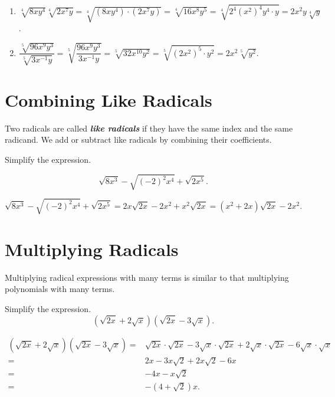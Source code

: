 \documentclass[en,12pt]{elegantbook}
\providecommand{\tightlist}{%
  \setlength{\itemsep}{0pt}\setlength{\parskip}{0pt}}
\providecommand{\tightlist}{%
  \setlength{\itemsep}{0pt}\setlength{\parskip}{0pt}}
\let\BeginKnitrBlock\begin \let\EndKnitrBlock\end
\begin{document}
\BeginKnitrBlock{solution}


\begin{enumerate}
\def\labelenumi{\arabic{enumi}.}
\tightlist
\item
  \(\sqrt[4]{8xy^4}\sqrt[4]{2x^7y}=\sqrt[4]{(8xy^4)\cdot (2x^7y)}=\sqrt[4]{16x^8y^5}=\sqrt[4]{2^4(x^2)^4y^4\cdot y}=2x^2y\sqrt[4]{y}\).
\item
  \(\dfrac{ \sqrt[5]{96x^9y^3} }{ \sqrt[5]{3x^{-1}y} }=\sqrt[5]{\dfrac{96x^9y^3}{3x^{-1}y}}=\sqrt[5]{32x^{10}y^2}=\sqrt[5]{(2x^2)^5\cdot y^2}=2x^2\sqrt[5]{y^2}\).
\end{enumerate}
\EndKnitrBlock{solution}

\hypertarget{combining-like-radicals}{%
\section{Combining Like Radicals}\label{combining-like-radicals}}

Two radicals are called \textbf{\emph{like radicals}} if they have the same index and the same radicand. We add or subtract like radicals by combining their coefficients.

\BeginKnitrBlock{example}
\protect\hypertarget{exm:unnamed-chunk-75}{}{\label{exm:unnamed-chunk-75} }
Simplify the expression.

\[
\sqrt{8x^3}-\sqrt{(-2)^2 x^4}+\sqrt{2x^5}.
\]
\EndKnitrBlock{example}

\BeginKnitrBlock{solution}


\[
\sqrt{8x^3}-\sqrt{(-2)^2 x^4}+\sqrt{2x^5}=2x\sqrt{2x}-2x^2+x^2\sqrt{2x}=(x^2+2x)\sqrt{2x}-2x^2.
\]
\EndKnitrBlock{solution}

\hypertarget{multiplying-radicals}{%
\section{Multiplying Radicals}\label{multiplying-radicals}}

Multiplying radical expressions with many terms is similar to that multiplying polynomials with many terms.

\BeginKnitrBlock{example}
\protect\hypertarget{exm:unnamed-chunk-77}{}{\label{exm:unnamed-chunk-77} }
Simplify the expression.
\[
(\sqrt{2x}+2\sqrt{x})(\sqrt{2x}-3\sqrt{x}).
\]
\EndKnitrBlock{example}

\BeginKnitrBlock{solution}


\[
\begin{aligned}
(\sqrt{2x}+2\sqrt{x})(\sqrt{2x}-3\sqrt{x})
=&\sqrt{2x}\cdot\sqrt{2x}-3\sqrt{x}\cdot\sqrt{2x}+2\sqrt{x}\cdot\sqrt{2x}-6\sqrt{x}\cdot\sqrt{x}\\
=&2x-3x\sqrt{2}+2x\sqrt{2}-6x\\
=&-4x-x\sqrt{2}\\
=&-(4+\sqrt{2})x.
\end{aligned}
\]
\EndKnitrBlock{solution}
\end{document}
